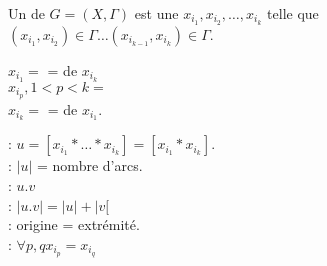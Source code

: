 Un  de $G=(X,\Gamma)$ est une  $x_{i_1},x_{i_2},\ldots,x_{i_k}$ telle que $(x_{i_1},x_{i_2})\in\Gamma \ldots (x_{i_{k-1}},x_{i_k})\in\Gamma$. \\

\par

$x_{i_1}=$  =  de $x_{i_k}$ \\
$x_{i_p},1<p<k =$ \\
$x_{i_k}=$  =  de $x_{i_1}$.\\

\par

 : $u=[x_{i_1}*\ldots *x_{i_k}] = [x_{i_1}*x_{i_k}]$. \\
 : $|u|$ = nombre d'arcs. \\
 : $u.v$\\
 : $|u.v|=|u|+|v[$\\
 : origine = extrémité. \\
 : $ \forall p,q x_{i_p}=x_{i_q}$
 

